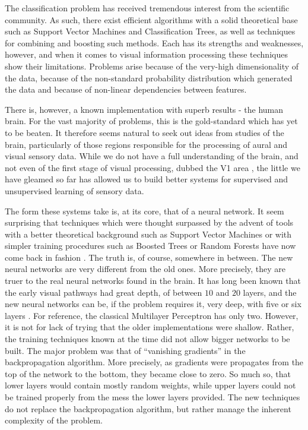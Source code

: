\documentclass[12pt,a4paper,oneside,english]{UPBThesis}
\begin{document}
The classification problem has received tremendous interest from the scientific community. As such, there exist efficient algorithms with a solid theoretical base such as Support Vector Machines and Classification Trees, as well as techniques for combining and boosting such methods. Each has its strengths and weaknesses, however, and when it comes to visual information processing these techniques show their limitations. Problems arise because of the very-high dimensionality of the data, because of the non-standard probability distribution which generated the data and because of non-linear dependencies between features.

There is, however, a known implementation with superb results - the human brain. For the vast majority of problems, this is the gold-standard which has yet to be beaten. It therefore seems natural to seek out ideas from studies of the brain, particularly of those regions responsible for the processing of aural and visual sensory data. While we do not have a full understanding of the brain, and not even of the first stage of visual processing, dubbed the V1 area \cite{understanding-V1,what-85percent-V1-doing}, the little we have gleamed so far has allowed us to build better systems for supervised \cite{gradient-based-learning,convolutional-networks-vision,best-practices-cnn,text-detection-character-recognition-unsupervised-feature-learning,multi-column-neural-networks,cnn-commitees-handwritten-character} and unsupervised learning \cite{high-level-features-unsupervised-feature-learning,tiny-images,reducing-dimensionality-neural-networks} of sensory data.

The form these systems take is, at its core, that of a neural network. It seem surprising that techniques which were thought surpassed by the advent of tools with a better theoretical background such as Support Vector Machines or with simpler training procedures such as Boosted Trees or Random Forests have now come back in fashion \cite{comparing-svm-cnn,mnist-website,best-architecture-object-recognition}. The truth is, of course, somewhere in between. The new neural networks are very different from the old ones. More precisely, they are truer to the real neural networks found in the brain. It has long been known that the early visual pathways had great depth, of between $10$ and $20$ layers, and the new neural networks can be, if the problem requires it, very deep, with five or six layers \cite{multi-column-neural-networks,gradient-based-learning}. For reference, the classical Multilayer Perceptron has only two. However, it is not for lack of trying that the older implementations were shallow. Rather, the training techniques known at the time did not allow bigger networks to be built. The major problem was that of ``vanishing gradients'' in the backpropagation algorithm. More precisely, as gradients were propagates from the top of the network to the bottom, they became close to zero. So much so, that lower layers would contain mostly random weights, while upper layers could not be trained properly from the mess the lower layers provided. The new techniques do not replace the backpropagation algorithm, but rather manage the inherent complexity of the problem.
\end{document}
